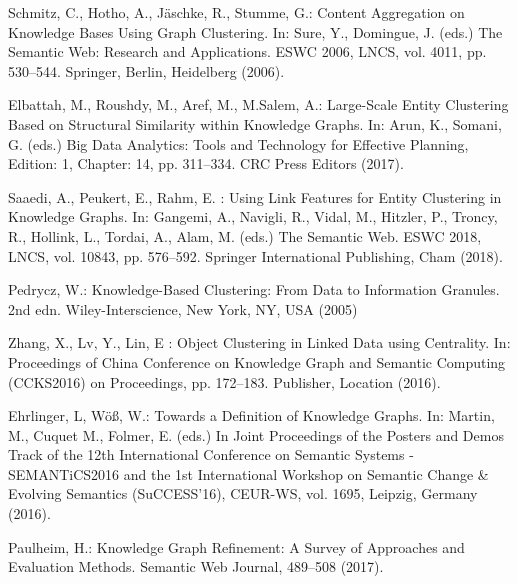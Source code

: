 \documentclass[runningheads]{llncs}
\begin{document}
%
%
%


%
\begin{thebibliography}{8}
Schmitz, C., Hotho, A., J{\"a}schke, R., Stumme, G.: Content Aggregation on Knowledge Bases Using Graph Clustering. In: Sure, Y., Domingue, J. (eds.) The Semantic Web: Research and Applications. ESWC 2006, LNCS, vol. 4011, pp. 530--544.
Springer, Berlin, Heidelberg (2006). 

Elbattah, M., Roushdy, M., Aref, M., M.Salem, A.: Large-Scale Entity Clustering Based on Structural Similarity within Knowledge Graphs. In: Arun, K., Somani, G. (eds.) Big Data Analytics: Tools and Technology for Effective Planning, Edition: 1, Chapter: 14, pp. 311--334. CRC Press Editors (2017). 

Saaedi, A., Peukert, E., Rahm, E.  : Using Link Features for Entity Clustering in Knowledge Graphs. In: Gangemi, A., Navigli, R., Vidal, M., Hitzler, P., Troncy, R., Hollink, L., Tordai, A., Alam, M. (eds.) The Semantic Web. ESWC 2018, LNCS, vol. 10843, pp. 576--592.
Springer International Publishing, Cham (2018). 

Pedrycz, W.: Knowledge-Based Clustering: From Data to Information Granules. 2nd edn. Wiley-Interscience, New York, NY, USA (2005)

Zhang, X., Lv, Y., Lin, E : Object Clustering in Linked Data using Centrality. In: Proceedings of China Conference on Knowledge Graph and Semantic Computing (CCKS2016)
on Proceedings, pp. 172--183. Publisher, Location (2016). 

Ehrlinger, L, W{\"o}{\ss}, W.: Towards a Definition of Knowledge Graphs. In: Martin, M., Cuquet M., Folmer, E. (eds.) In Joint Proceedings of the Posters and Demos Track of the 12th International Conference on Semantic Systems - SEMANTiCS2016 and the 1st International Workshop on Semantic Change \& Evolving Semantics (SuCCESS'16), CEUR-WS, vol. 1695, Leipzig, Germany (2016). 

Paulheim, H.: Knowledge Graph Refinement: A Survey of Approaches and Evaluation Methods. Semantic Web Journal, 489--508 (2017). 


\end{thebibliography}
\end{document}
